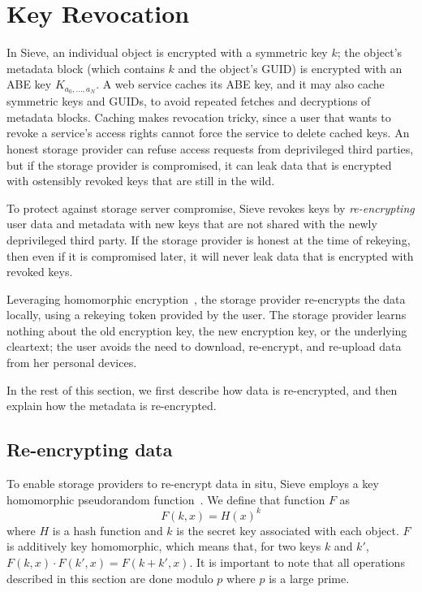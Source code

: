 \section{Key Revocation}
\label{sec:revocation}

In Sieve, an individual object is encrypted
with a symmetric key $k$; the object's metadata
block (which contains $k$ and the object's
GUID) is encrypted with an ABE key $K_{a_0,\ldots,a_N}$.
A web service caches its ABE key, and it may also
cache symmetric keys and GUIDs, to avoid
repeated fetches and decryptions of metadata
blocks. Caching makes revocation tricky,
since a user that wants to revoke a service's
access rights cannot force the service to delete
cached keys. An honest storage provider can
refuse access requests from deprivileged third
parties, but if the storage provider is
compromised, it can leak data that is
encrypted with ostensibly revoked keys
that are still in the wild.

To protect against storage server compromise,
Sieve revokes keys by \emph{re-encrypting}
user data and metadata with new keys that
are not shared with the newly deprivileged
third party. If the storage provider is
honest at the time of rekeying, then even
if it is compromised later, it will never
leak data that is encrypted with revoked
keys.

Leveraging homomorphic encryption~\cite{gentry},
the storage provider re-encrypts the data
locally, using a rekeying token provided
by the user. The storage provider learns
nothing about the old encryption key, the
new encryption key, or the underlying cleartext;
the user avoids the need to download, re-encrypt, and 
re-upload data from her personal devices.

In the rest of this section, we first describe
how data is re-encrypted, and then explain how
the metadata is re-encrypted.

\subsection{Re-encrypting data} 
To enable storage providers to re-encrypt data in situ, 
Sieve employs a key homomorphic pseudorandom
function~\cite{keyhom, npr99}. We
define that function $F$ as
  \begin{equation*}
    F(k, x) = H(x)^k 
  \end{equation*}
where $H$ is a hash function and $k$ is the
secret key associated with each object. $F$
is additively key homomorphic, which means
that, for two keys $k$ and $k'$,
$F(k,x) \cdot F(k',x) = F(k+k',x)$. It is important
to note that all operations described in this section
are done modulo $p$ where $p$ is a large prime.

